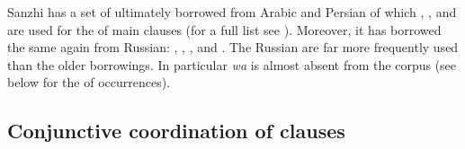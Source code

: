 Sanzhi has a set of  ultimately borrowed from Arabic and Persian of which  ,  , and   are used for the  of main clauses (for a full list see ). Moreover, it has borrowed the same  again from Russian:  ,  ,  , and  . The Russian  are far more frequently used than the older borrowings. In particular \textit{wa} is almost absent from the corpus (see below for the  of occurrences).



\subsection{Conjunctive coordination of clauses}
\label{ssec:Conjunctive coordination of clauses}

